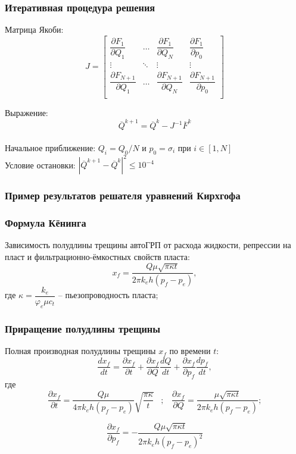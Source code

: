 \documentclass{beamer}
\begin{document}
\begin{frame}
\frametitle{Итеративная процедура решения}
Матрица Якоби:
$$J = \begin{bmatrix}
	\dfrac{\partial F_1}{\partial Q_1} & \dots & \dfrac{\partial F_1}{\partial Q_N} & \dfrac{\partial F_1}{\partial p_0} \\
	\vdots & \ddots & \vdots & \vdots \\
	\dfrac{\partial F_{N+1}}{\partial Q_1} & \dots & \dfrac{\partial F_{N+1}}{\partial Q_N} & \dfrac{\partial F_{N+1}}{\partial p_0} \\
	\end{bmatrix}
$$

Выражение:
$$\overline{Q}^{k+1}=\overline{Q}^k-J^{-1}\overline{F}^k$$
\ \\

Начальное приближение:
$Q_i=Q_0/N\text{ и }p_0=\sigma_i\text{ при } i\in\left[1,N\right]$
\ \\

Условие остановки:
$\left|\overline{Q}^{k+1}-\overline{Q}^k\right|^2\leqslant10^{-4}$

\end{frame}


\begin{frame}
\frametitle{Пример результатов решателя уравнений Кирхгофа}

\end{frame}


\begin{frame}
\frametitle{Формула Кёнинга}
Зависимость полудлины трещины автоГРП от расхода жидкости, репрессии на пласт и фильтрационно-ёмкостных свойств пласта:
$$
x_{\!f}=\frac{Q\mu\sqrt{\pi\kappa t}}{2\pi k_eh\left(p_{\!f}-p_e\right)},
$$
где
$\kappa=\dfrac{k_e}{\varphi_e\mu c_t}$ -- пьезопроводность пласта;
\end{frame}


\begin{frame}
\frametitle{Приращение полудлины трещины}

Полная производная полудлины трещины $x_{\!f}$ по времени $t$:
$$
\frac{dx_{\!f}}{dt}=\frac{\partial x_{\!f}}{\partial t}+\frac{\partial x_{\!f}}{\partial Q}\frac{dQ}{dt}+\frac{\partial x_{\!f}}{\partial p_{\!f}}\frac{dp_{\!f}}{dt},
$$
где
$$
\frac{\partial x_{\!f}}{\partial t}=\frac{Q\mu}{4\pi k_eh\left(p_{\!f}-p_e\right)}\sqrt{\frac{\pi\kappa}{t}}\,\,\,\,\,;\,\,\,\,\,\frac{\partial x_{\!f}}{\partial Q}=\frac{\mu\sqrt{\pi\kappa t}}{2\pi k_eh\left(p_{\!f}-p_e\right)};
$$

$$
\frac{\partial x_{\!f}}{\partial p_{\!f}}=-\frac{Q\mu\sqrt{\pi\kappa t}}{2\pi k_eh\left(p_{\!f}-p_e\right)^2}
$$
\end{frame}
\end{document}
